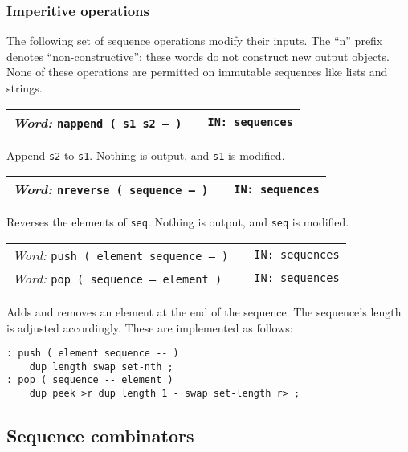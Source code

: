 \documentclass{report}
\newcommand{\ordinaryword}[3]{\index{#1}
\emph{Word:} \texttt{#2} &&\texttt{IN: #3}}
\newcommand{\wordtable}[1]{

\begin{tabularx}{12cm}[t]{lXr}
\hline
#1\\
\hline
\end{tabularx}

}
\begin{document}
\subsubsection{Imperitive operations}

The following set of sequence operations modify their inputs. The ``n'' prefix denotes ``non-constructive''; these words do not construct new output objects. None of these operations are permitted on immutable sequences like lists and strings.

\wordtable{
\ordinaryword{nappend}{nappend ( s1 s2 -- )}{sequences}
}
Append \texttt{s2} to \texttt{s1}. Nothing is output, and \texttt{s1} is modified.
\wordtable{
\ordinaryword{nreverse}{nreverse ( sequence -- )}{sequences}
}
Reverses the elements of \texttt{seq}. Nothing is output, and \texttt{seq} is modified.
\wordtable{
\ordinaryword{push}{push ( element sequence -- )}{sequences}\\
\ordinaryword{pop}{pop ( sequence -- element )}{sequences}
}

Adds and removes an element at the end of the sequence. The sequence's length is adjusted accordingly. These are implemented as follows:
\begin{verbatim}
: push ( element sequence -- )
    dup length swap set-nth ;
: pop ( sequence -- element )
    dup peek >r dup length 1 - swap set-length r> ;
\end{verbatim}

\subsection{Sequence combinators}
\end{document}
